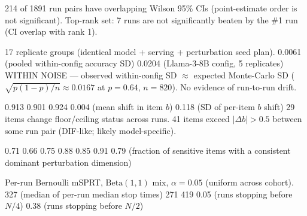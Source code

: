    {214 of 1891 run pairs have overlapping Wilson 95\%
                           CIs (point-estimate order is not significant).}
       {Top-rank set: 7 runs are not significantly beaten
                           by the \#1 run (CI overlap with rank 1).}

      {17 replicate groups (identical model + serving +
                           perturbation seed plan).}
          {0.0061 \textnormal{(pooled within-config accuracy SD)}}
    {0.0204 \textnormal{(Llama-3-8B config, 5 replicates)}}
     {WITHIN NOISE --- observed within-config SD
                           $\approx$ expected Monte-Carlo SD
                           ($\sqrt{p(1-p)/n}\approx 0.0167$ at $p{=}0.64$,
                           $n{=}820$). No evidence of run-to-run drift.}

      {0.913}
   {0.901}
   {0.924}
    {0.004 \textnormal{(mean shift in item }$b$\textnormal{)}}
      {0.118 \textnormal{(SD of per-item }$b$\textnormal{ shift)}}
         {29 items change floor/ceiling status across runs.}
           {41 items exceed $|\Delta b|>0.5$ between some run
                           pair (DIF-like; likely model-specific).}

     {0.71}
  {0.66}
  {0.75}
     {0.88}
  {0.85}
  {0.91}
     {0.79 \textnormal{(fraction of sensitive items with a
                           consistent dominant perturbation dimension)}}

       {Per-run Bernoulli mSPRT, $\mathrm{Beta}(1,1)$ mix,
                           $\alpha{=}0.05$ (uniform across cohort).}
       {327 \textnormal{(median of per-run median stop times)}}
       {271}
       {419}
      {0.05 \textnormal{(runs stopping before }$N/4$\textnormal{)}}
    {0.38 \textnormal{(runs stopping before }$N/2$\textnormal{)}}

